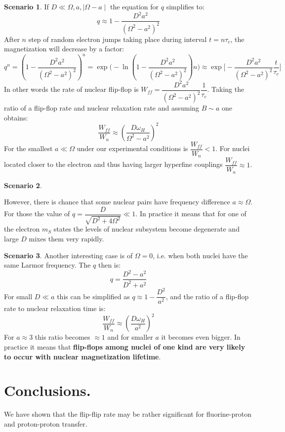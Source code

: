 \documentclass[a4paper, 12pt]{article}
\begin{document}
\textbf{Scenario 1}.
If $D \ll \Omega, a, \mid \Omega - a \mid  $ the equation for $q$ simplifies to:
\begin{equation}
  q \approx 1 - \dfrac{D^2 a^2}{(\Omega^2 - a^2)^2}
\end{equation}
 After $n$ step of random electron jumps taking place during interval $t =  n \tau_c $, the magnetization will decrease by a factor:
 \begin{equation}
    q^n = (1 - \dfrac{D^2 a^2}{(\Omega^2 - a^2)^2} )^n  = \exp \Big(-\ln (1 - \dfrac{D^2 a^2}{(\Omega^2 - a^2)^2}) n \Big) \approx \exp \Big[-\dfrac{D^2 a^2}{(\Omega^2 - a^2)^2} \dfrac{t}{ \tau_c} \Big]
 \end{equation}
 In other words the rate of nuclear flip-flop is $W_{ff} = \dfrac{D^2 a^2}{(\Omega^2 - a^2)^2} \dfrac{1}{ \tau_c} $. Taking the ratio of a flip-flop rate and nuclear relaxation rate and assuming $B  \sim a$ one obtains:
 \begin{equation}
    \dfrac{W_{ff}}{W_n} \approx ( \dfrac{D \omega_H}{\Omega^2 - a^2} )^2
 \end{equation}
 For the smallest $a \ll \Omega$ under our experimental conditions is $ \dfrac{W_{ff}}{W_n} < 1$. For nuclei located closer to the electron and thus having larger hyperfine couplings $ \dfrac{W_{ff}}{W_n} \approx 1$. 
 
\textbf{Scenario 2}.

However, there is chance that some nuclear pairs have frequency difference  $a \approx \Omega$. For those the value of $q = \dfrac{D}{\sqrt{D^2 + 4 \Omega ^2}} \ll 1$. In practice it means that for one of the electron $m_S$ states the levels of nuclear subsystem become degenerate and large $D$ mixes them very rapidly.

\textbf{Scenario 3}.
Another interesting case is of $\Omega = 0$, i.e. when both nuclei have the same Larmor frequency. The $q$  then is:
\begin{equation}
  q = \dfrac{D^2 - a^2 }{D^2 + a^2}
\end{equation}
For small $D \ll a$ this can be simplified as $q \approx 1 - \dfrac{D^2}{a^2}$, and the ratio of a flip-flop rate to nuclear relaxation time is:
\begin{equation}
    \dfrac{W_{ff}}{W_n} \approx ( \dfrac{D \omega_H}{a^2} )^2
\end{equation}
For $a \approx 3$ this ratio becomes $\approx 1$ and for smaller $a$ it becomes even bigger. In practice it means that \textbf{flip-flops among nuclei of one kind are very likely to occur with nuclear magnetization lifetime}.





\section{Conclusions.}
We have shown that the flip-flip rate may be rather significant for fluorine-proton and proton-proton transfer.

  
\end{document}
